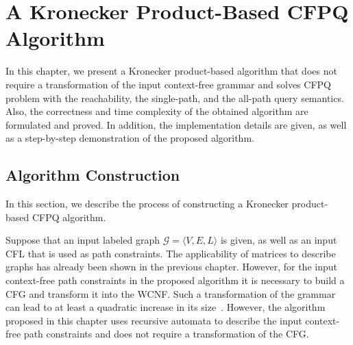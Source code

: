 \chapter{A Kronecker Product-Based CFPQ Algorithm}\label{ch:ch4}
In this chapter, we present a Kronecker product-based algorithm that does not require a transformation of the input context-free grammar and solves CFPQ problem with the reachability, the single-path, and the all-path query semantics. Also, the correctness and time complexity of the obtained algorithm are formulated and proved. In addition, the implementation details are given, as well as a step-by-step demonstration of the proposed algorithm.

\section{Algorithm Construction}\label{sec:ch4/sect1}
In this section, we describe the process of constructing a Kronecker product-based CFPQ algorithm.

Suppose that an input labeled graph $\mathcal{G} = \langle V, E, L \rangle$ is given, as well as an input CFL that is used as path constraints. The applicability of matrices to describe graphs has already been shown in the previous chapter. However, for the input context-free path constraints in the proposed algorithm it is necessary to build a CFG and transform it into the WCNF. Such a transformation of the grammar can lead to at least a quadratic increase in its size~\cite{hopcroft2001introduction}. However, the algorithm proposed in this chapter uses recursive automata to describe the input context-free path constraints and does not require a transformation of the CFG.


